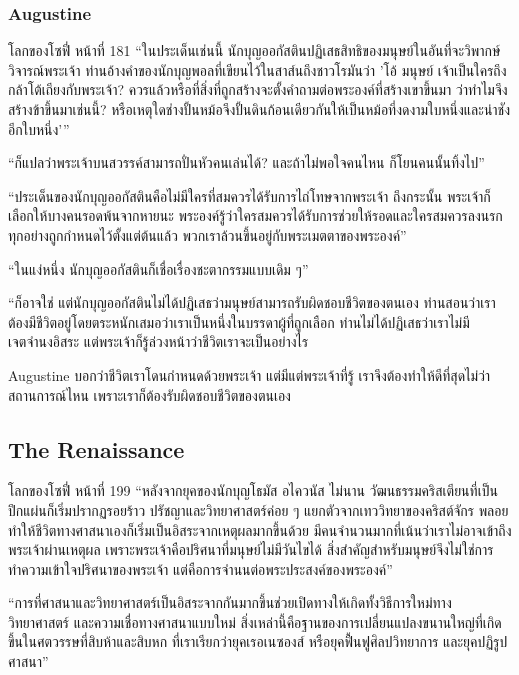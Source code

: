 \subsubsection{Augustine}

\begin{bookquote}{โลกของโซฟี่ หน้าที่ 181}
“ในประเด็นเช่นนี้ นักบุญออกัสตินปฏิเสธสิทธิของมนุษย์ในอันที่จะวิพากษ์วิจารณ์พระเจ้า ท่านอ้างคำของนักบุญพอลที่เขียนไว้ในสาส์นถึงชาวโรมันว่า 'โอ้ มนุษย์ เจ้าเป็นใครถึงกล้าโต้เถียงกับพระเจ้า? ควรแล้วหรือที่สิ่งที่ถูกสร้างจะตั้งคำถามต่อพระองค์ที่สร้างเขาขึ้นมา ว่าทำไมจึงสร้างข้าขึ้นมาเช่นนี้? หรือเหตุใดช่างปั้นหม้อจึงปั้นดินก้อนเดียวกันให้เป็นหม้อที่งดงามใบหนึ่งและน่าชังอีกใบหนึ่ง'”

“ก็แปลว่าพระเจ้าบนสวรรค์สามารถปั่นหัวคนเล่นได้? และถ้าไม่พอใจคนไหน ก็โยนคนนั้นทิ้งไป”

“ประเด็นของนักบุญออกัสตินคือไม่มีใครที่สมควรได้รับการไถ่โทษจากพระเจ้า ถึงกระนั้น พระเจ้าก็เลือกให้บางคนรอดพ้นจากหายนะ พระองค์รู้ว่าใครสมควรได้รับการช่วยให้รอดและใครสมควรลงนรก ทุกอย่างถูกกำหนดไว้ตั้งแต่ต้นแล้ว พวกเราล้วนขึ้นอยู่กับพระเมตตาของพระองค์”

“ในแง่หนึ่ง นักบุญออกัสตินก็เชื่อเรื่องชะตากรรมแบบเดิม ๆ”

“ก็อาจใช่ แต่นักบุญออกัสตินไม่ได้ปฏิเสธว่ามนุษย์สามารถรับผิดชอบชีวิตของตนเอง ท่านสอนว่าเราต้องมีชีวิตอยู่โดยตระหนักเสมอว่าเราเป็นหนึ่งในบรรดาผู้ที่ถูกเลือก ท่านไม่ได้ปฏิเสธว่าเราไม่มีเจตจำนงอิสระ แต่พระเจ้าก็รู้ล่วงหน้าว่าชีวิตเราจะเป็นอย่างไร
\end{bookquote}

Augustine บอกว่าชีวิตเราโดนกำหนดด้วยพระเจ้า แต่มีแต่พระเจ้าที่รู้ เราจึงต้องทำให้ดีที่สุดไม่ว่าสถานการณ์ไหน เพราะเราก็ต้องรับผิดชอบชีวิตของตนเอง

\subsection{The Renaissance}

\begin{bookquote}{โลกของโซฟี่ หน้าที่ 199}
“หลังจากยุคของนักบุญโธมัส อไควนัส ไม่นาน วัฒนธรรมคริสเตียนที่เป็นปึกแผ่นก็เริ่มปรากฏรอยร้าว ปรัชญาและวิทยาศาสตร์ค่อย ๆ แยกตัวจากเทววิทยาของคริสต์จักร พลอยทำให้ชีวิตทางศาสนาเองก็เริ่มเป็นอิสระจากเหตุผลมากขึ้นด้วย มีคนจำนวนมากที่เน้นว่าเราไม่อาจเข้าถึงพระเจ้าผ่านเหตุผล เพราะพระเจ้าคือปริศนาที่มนุษย์ไม่มีวันไขได้ สิ่งสำคัญสำหรับมนุษย์จึงไม่ใช่การทำความเข้าใจปริศนาของพระเจ้า แต่คือการจำนนต่อพระประสงค์ของพระองค์”

“การที่ศาสนาและวิทยาศาสตร์เป็นอิสระจากกันมากขึ้นช่วยเปิดทางให้เกิดทั้งวิธีการใหม่ทางวิทยาศาสตร์ และความเชื่อทางศาสนาแบบใหม่ สิ่งเหล่านี้คือฐานของการเปลี่ยนแปลงขนานใหญ่ที่เกิดขึ้นในศตวรรษที่สิบห้าและสิบหก ที่เราเรียกว่ายุคเรอเนซองส์ หรือยุคฟื้นฟูศิลปวิทยาการ และยุคปฏิรูปศาสนา”
\end{bookquote}

